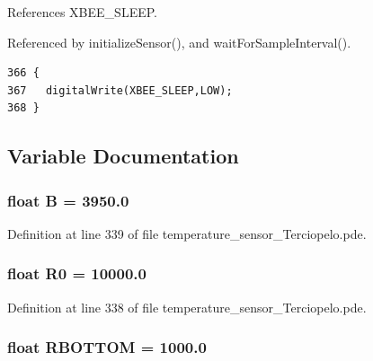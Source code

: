 References XBEE\_\-SLEEP.

Referenced by initializeSensor(), and waitForSampleInterval().

\begin{Code}\begin{verbatim}366 {
367   digitalWrite(XBEE_SLEEP,LOW);
368 }
\end{verbatim}
\end{Code}




\subsection{Variable Documentation}
\hypertarget{temperature__sensor___terciopelo_8pde_8188fea1f6709096fe21a3ee084d00d0}{
\subsubsection[{B}]{\setlength{\rightskip}{0pt plus 5cm}float {\bf B} = 3950.0}}
\label{temperature__sensor___terciopelo_8pde_8188fea1f6709096fe21a3ee084d00d0}




Definition at line 339 of file temperature\_\-sensor\_\-Terciopelo.pde.\hypertarget{temperature__sensor___terciopelo_8pde_735577560ca40e5b6008a98829068904}{
\subsubsection[{R0}]{\setlength{\rightskip}{0pt plus 5cm}float {\bf R0} = 10000.0}}
\label{temperature__sensor___terciopelo_8pde_735577560ca40e5b6008a98829068904}




Definition at line 338 of file temperature\_\-sensor\_\-Terciopelo.pde.\hypertarget{temperature__sensor___terciopelo_8pde_d17df5990b551ac9e97a3d60f65833ff}{
\subsubsection[{RBOTTOM}]{\setlength{\rightskip}{0pt plus 5cm}float {\bf RBOTTOM} = 1000.0}}
\label{temperature__sensor___terciopelo_8pde_d17df5990b551ac9e97a3d60f65833ff}




